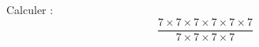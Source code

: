 
\begin{exercice}\label{exo2smath-0229}

    Calculer :
    \begin{equation}
        \frac{ 7\times 7\times 7\times 7\times 7\times 7 }{ 7\times 7\times 7\times 7 }
    \end{equation}

\end{exercice}
